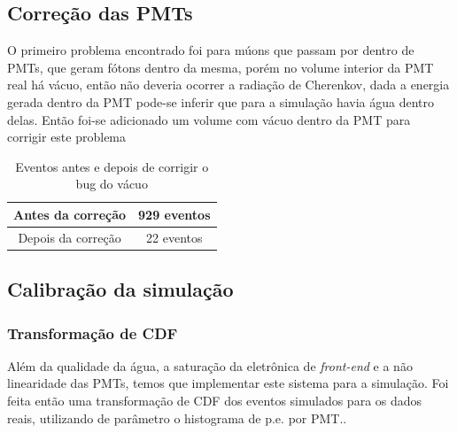 \subsection{Correção das PMTs}

O primeiro problema encontrado foi para múons que passam por dentro de PMTs, que geram fótons dentro da mesma, porém no volume interior da PMT real há vácuo, então não deveria ocorrer a radiação de Cherenkov, dada a energia gerada dentro da PMT pode-se inferir que para a simulação havia água dentro delas. Então foi-se adicionado um volume com vácuo dentro da PMT para corrigir este problema

\begin{table}[H]
	\centering
	\begin{tabular}{|c|c|}
		\hline
		Antes da correção  & 929 eventos \\ \hline
		Depois da correção & 22  eventos \\ \hline
	\end{tabular}

\caption{Eventos antes e depois de corrigir o bug do vácuo}
\end{table}

\subsection{Calibração da simulação}



\subsubsection{Transformação de CDF}

Além da qualidade da água, a saturação da eletrônica de \emph{front-end} e a não linearidade das PMTs, temos que implementar este sistema para a simulação. Foi feita então uma transformação de \ac{CDF} dos eventos simulados para os dados reais, utilizando de parâmetro o histograma de p.e. por PMT.. 


